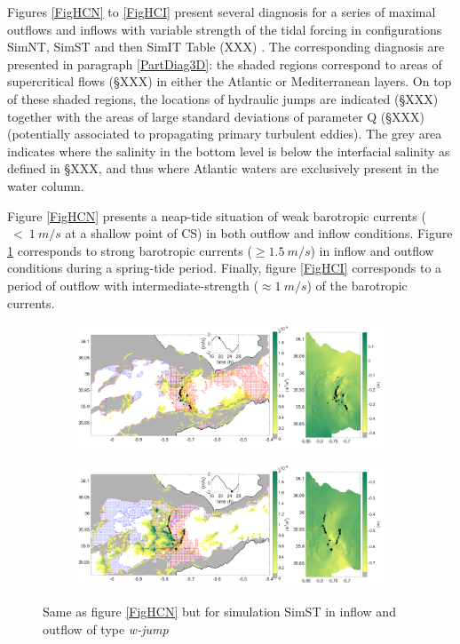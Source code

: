 Figures \ref{FigHCN} to \ref{FigHCI} present several diagnosis for a series of maximal outflows and inflows \color{blue} with \color{black} variable strength of the tidal forcing in configurations SimNT, SimST and then SimIT \color{blue}Table (XXX) \color{black}. The corresponding diagnosis are presented in paragraph \ref{PartDiag3D}: \color{blue}the shaded regions correspond to areas of supercritical flows (\S XXX) in either the Atlantic or Mediterranean layers. On top of these shaded regions, the locations of hydraulic jumps are indicated (\S XXX) together with the areas of large standard deviations of parameter Q (\S XXX) (potentially associated to propagating primary turbulent eddies). \color{black} The grey area indicates where the salinity in the bottom level is below the interfacial salinity as defined in \S XXX, and thus \color{blue} where Atlantic waters are exclusively present in the water column. \color{black}

Figure \ref{FigHCN} presents a \color{blue} neap-tide situation \color{black} of weak barotropic currents ($\ <\ 1\ m/s$ at a shallow point of CS) in \color{blue} both outflow and inflow conditions\color{black}. Figure \ref{FigHCS} \color{blue} corresponds to \color{black} strong barotropic currents ($\geq 1.5\ m/s$) in inflow and outflow conditions during a spring-tide period. Finally, figure \ref{FigHCI} corresponds to a period of outflow with intermediate-strength ($\approx 1\ m/s$) of the barotropic currents. \color{black}

\begin{figure}[!h]
 \centering
\begin{subfigure}{\linewidth}
\centering
\includegraphics[width=\linewidth]{./GBR3D/VE2_19h30_p.png}
\end{subfigure}

\begin{subfigure}{\linewidth}
\centering
\includegraphics[width=\linewidth]{./GBR3D/VE2_25h_p.png}
\end{subfigure}
\caption {Same as figure \ref{FigHCN} but for simulation SimST in inflow and outflow of type \textit{w-jump}}
\label{FigHCS}
\end{figure}

